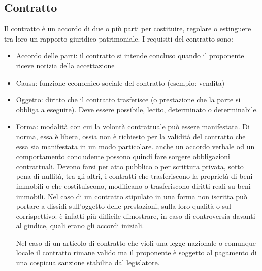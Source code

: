 \subsection{Contratto}
Il contratto è un accordo di due o più parti per costituire, regolare o estinguere tra loro un rapporto giuridico patrimoniale.\newline
I requisiti del contratto sono:
\begin{itemize}
    \item Accordo delle parti: il contratto si intende concluso quando il proponente riceve notizia della accettazione
    \item Causa: funzione economico-sociale del contratto (esempio: vendita)
    \item Oggetto: diritto che il contratto trasferisce (o prestazione che la parte si obbliga a eseguire). Deve essere possibile, lecito, determinato
        o determinabile.
    \item Forma: modalità con cui la volontà contrattuale può essere manifestata. Di norma, essa è libera, 
        ossia non è richiesto per la validità del contratto che essa sia manifestata in un modo particolare. anche un accordo verbale od un comportamento 
        concludente possono quindi fare sorgere obbligazioni contrattuali.
        Devono farsi per atto pubblico o per scrittura privata, sotto pena di nullità, tra gli altri, i contratti che trasferiscono la proprietà di beni 
        immobili o che costituiscono, modificano o trasferiscono diritti reali su beni immobili.\newline
        Nel caso di un contratto stipulato in una forma non iscritta può portare a dissidi sull'oggetto delle prestazioni, sulla loro qualità o sul corrispettivo: è 
        infatti più difficile dimostrare, in caso di controversia davanti al giudice, quali erano gli accordi iniziali. \newline

        Nel caso di un articolo di contratto che violi una legge nazionale o comunque locale il contratto rimane valido ma il proponente è soggetto
        al pagamento di una cospicua sanzione stabilita dal legislatore.

\end{itemize}

